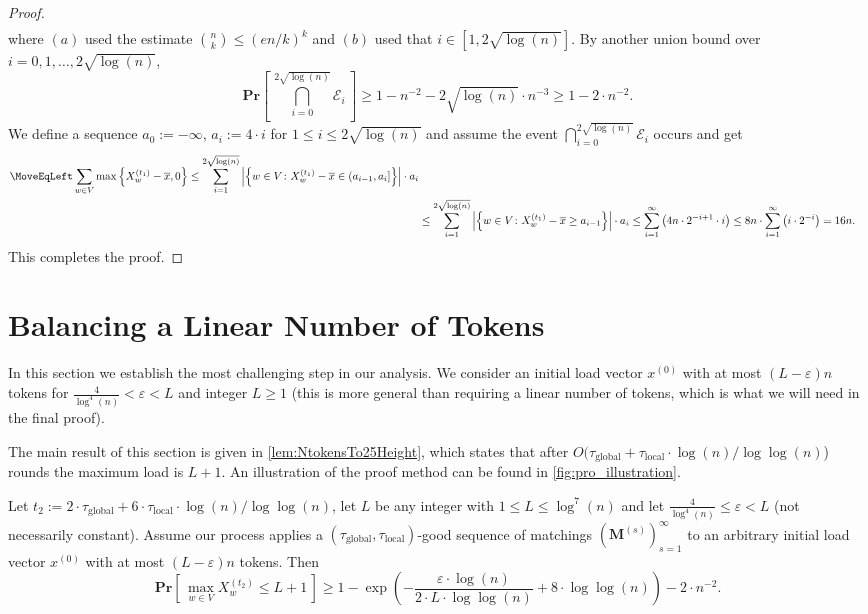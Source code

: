 \documentclass[twoside,leqno]{article}
\newcommand{\Pro}[1]{\mathbf{Pr} \left[\,#1\,\right]}
\newcommand{\M}{\mathbf{M}}
\DeclareMathOperator{\1}{\mathbf{1}}
\newcommand{\taulocal}{\tau_{\mathrm{local}}}
\newcommand{\tauglobal}{\tau_{\mathrm{global}}}
\numberwithin{equation}{section}
\let\epsilon\varepsilon
\newcommand{\newL}{L}
\begin{document}
\begin{proof}
\begin{align*}
\end{align*}
where $(a)$ used the estimate $\binom{n}{k} \leq (en/k)^k$ and $(b)$ used that $i \in [1, 2\sqrt{\log(n)} ]$.
By another union bound over $i=0,1,\ldots,2\sqrt{\log(n)} $,
\[
\Pro{ \bigcap_{i=0}^{2\sqrt{\log(n)}} \mathcal{E}_i } \geq 1 - n^{-2} - 2\sqrt{\log(n)} \cdot n^{-3} \geq 1 - 2\cdot n^{-2}.
\]
We define a sequence $a_0 := -\infty$, $a_i:= 4 \cdot i$ for $1 \leq i \leq 2\sqrt{\log(n)}$ and assume the event $\bigcap_{i=0}^{2\sqrt{\log(n)}} \mathcal{E}_i $ occurs and get
\begin{align*}
\MoveEqLeft\sum_{w \in V} \max \left\{ X_w^{(t_1)} - \overline{x}, 0 \right\} \leq
\sum_{i=1}^{2\sqrt{\log(n)}} \left| \left\{ w \in V \colon X_w^{(t_1)} - \overline{x} \in (a_{i-1}, a_{i} ] \right\} \right| \cdot a_i \\
&\leq
\sum_{i=1}^{2\sqrt{\log(n)}} \left| \left\{ w \in V \colon X_w^{(t_1)} - \overline{x} \geq a_{i-1} \right\} \right| \cdot a_i \leq \sum_{i=1}^{\infty} \left( 4n \cdot 2^{-i+1} \cdot i \right)
\leq 8 n\cdot \sum_{i=1}^{\infty} \left( i \cdot 2^{-i} \right)
= 16 n.
\end{align*}
This completes the proof.
\end{proof}






\section{Balancing a Linear Number of Tokens}\label{sec:spreading}


In this section we establish the most challenging step in our analysis. 
We consider an initial load vector $x^{(0)}$ with at most $(\newL-\epsilon) n$ tokens for $\frac{4}{\log^4(n)} <\epsilon<\newL$ and integer $\newL \geq 1$ (this is more general than requiring a linear number of tokens, which is what we will need in the final proof).

The main result of this section is given in \cref{lem:NtokensTo25Height}, which states that after $O(\tauglobal + \taulocal\cdot \log(n)/\log\log(n)$) rounds the maximum load is $L+1$. An illustration of the proof method can be found in \cref{fig:pro_illustration}.


\begin{proposition}
\label{lem:NtokensTo25Height}
Let $t_2 :=2 \cdot \tauglobal+ {6\cdot \taulocal \cdot \log (n)}/{\log\log(n)}$, let $L$ be any integer with $1 \leq L \leq \log^7 (n)$ and let $\frac{4}{\log^4 (n)} \leq \epsilon< \newL$ (not necessarily constant).
Assume our process applies a $(\tauglobal,\taulocal)$-good sequence of matchings $\left(\M^{(s)}\right)_{s=1}^{\infty}$ to an arbitrary initial load vector $x^{(0)}$ with at most $(\newL-\epsilon) n$ tokens.
Then
\[
\Pro{ \max_{w \in V}X_w^{(t_2)} \leq \newL+1 } 
\geq 1-\exp\left(-\frac{\epsilon\cdot \log (n)}{2\cdot \newL\cdot \log\log (n)}
+ 8\cdot\log \log (n)\right) - 2\cdot n^{-2}.
\]
\end{proposition}
\end{document}
